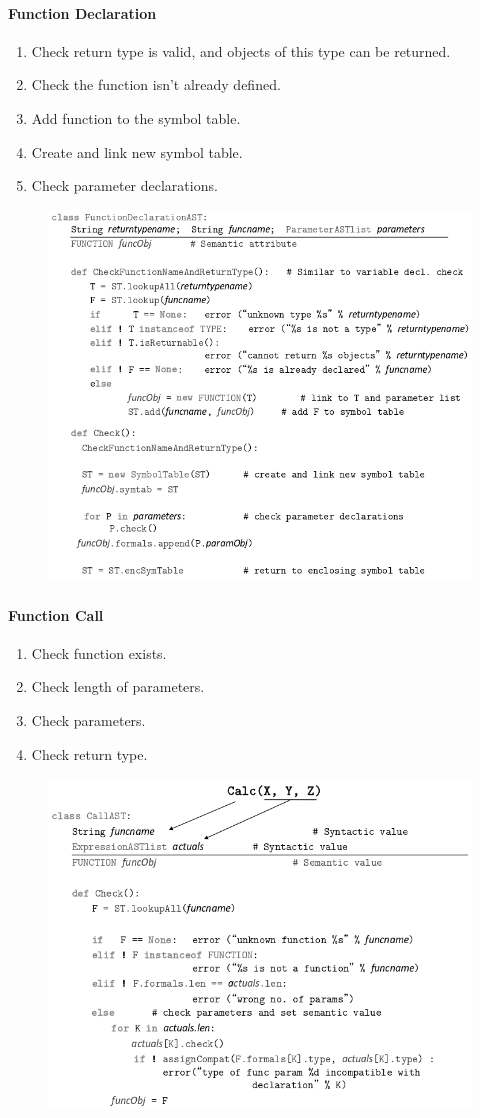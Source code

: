 \documentclass[twocolumn,english]{article}
\begin{document}
\paragraph{Function Declaration}
\begin{enumerate}
\item Check return type is valid, and objects of this type can be returned. 
\item Check the function isn't already defined. 
\item Add function to the symbol table. 
\item Create and link new symbol table. 
\item Check parameter declarations. 
\end{enumerate}
\begin{figure}[H]
\centering{}\includegraphics[width=0.8\linewidth]{img/func-declaration} 
\end{figure}

\paragraph{Function Call}
\begin{enumerate}
\item Check function exists. 
\item Check length of parameters. 
\item Check parameters. 
\item Check return type. 
\end{enumerate}
\begin{figure}[H]
\centering{}\includegraphics[width=0.75\linewidth]{img/func-call} 
\end{figure}
\end{document}
